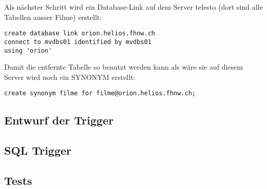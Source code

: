 \documentclass[11pt,a4paper,parskip=half]{scrartcl}
\begin{document}
Als nächster Schritt wird ein Database-Link auf dem Server telesto (dort sind alle Tabellen ausser Filme) erstellt:

\begin{lstlisting}
create database link orion.helios.fhnw.ch
connect to mvdbs01 identified by mvdbs01
using 'orion'
\end{lstlisting}

Damit die entfernte Tabelle so benutzt werden kann als wäre sie auf diesem Server wird noch ein SYNONYM erstellt:
\begin{lstlisting}
create synonym filme for filme@orion.helios.fhnw.ch;
\end{lstlisting}

\subsection{Entwurf der Trigger}

\subsection{SQL Trigger}

\subsection{Tests}
\end{document}
